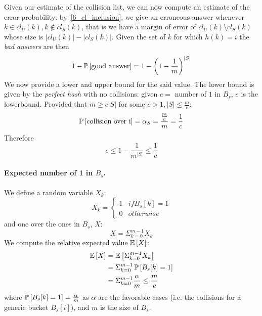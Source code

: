 Given our estimate of the collision list, we can now compute an estimate of the
error probability: by~\ref{6_cl_inclusion}, we give an erroneous answer whenever
$k \in cl_{U}(k), k \notin cl_{S}(k)$, that is we have a margin of error of
$cl_{U}(k) \setminus cl_{S}(k)$ whose size is $|cl_{U}(k)| - |cl_{S}(k)|$.
Given the set of $k$ for which $h(k) = i$ the \emph{bad answers} are then
    \begin{equation}
    1 - \operatorname*{\mathbb{P}}\left[{\textrm{good answer}}\right] = 1 - \left(1 - \frac{1}{m}\right)^{|S|}
    \end{equation}
We now provide a lower and upper bound for the said value.
The lower bound is given by the \emph{perfect hash} with no collisions: given
$e = $ number of $1$ in $B_s$, $e$ is the lowerbound.
Provided that  $m \geq c |S|$ for some $c > 1, |S| \leq \frac{m}{c}$:
    \begin{equation}
    \operatorname*{\mathbb{P}}\left[{\textrm{collision over i}}\right] = \alpha_{S} = \frac{\frac{m}{c}}{m} = \frac{1}{c}
    \end{equation}
Therefore
    \begin{equation}
    e \leq 1 - \frac{1}{m^{|S|}} \leq \frac{1}{c}
    \end{equation}

\paragraph{Expected number of 1 in $B_{s}$.}
We define a random variable $X_{k}$:
    \begin{equation*}
    X_{k} = \begin{cases}
            1   & if B_{s}[k] = 1  \\
            0   & otherwise
            \end{cases}
    \end{equation*}
and one over the ones in $B_{s}$, $X$:
    \begin{equation}
        X = \Sigma_{k = 0}^{m - 1}X_k
    \end{equation}
We compute the relative expected value $\mathbb{E}\left[{X}\right]$:
    \begin{align*}
       \mathbb{E}\left[{X}\right] & = \mathbb{E}\left[{\Sigma_{k = 0}^{m - 1}X_k}\right] \\
       & = \Sigma_{k = 0}^{m - 1}\operatorname*{\mathbb{P}}\left[{B_{s}[k] = 1}\right] \\
       & = \Sigma_{k = 0}^{m - 1}\frac{\alpha}{m} \leq \frac{m}{c}
   \end{align*}
where $\operatorname*{\mathbb{P}}\left[{B_{s}[k] = 1}\right] = \frac{\alpha}{m}$ as $\alpha$ are the favorable cases
(i.e. the collisions for a generic bucket $B_s[i]$), and $m$ is the size of $B_s$.